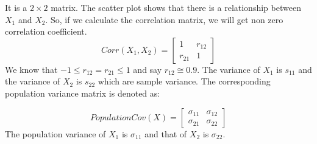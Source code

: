 \documentclass[12pt,a4paper]{report}
\begin{document}
It is a $2 \times 2$ matrix. The scatter plot shows that there is a relationship between $X_1$ and $X_2$. So, if we calculate the correlation matrix, we will get non zero correlation coefficient.
\[ Corr(X_{1},X_{2}) = 
\begin{bmatrix}
    1 & r_{12}  \\
    r_{21} & 1 
\end{bmatrix}
\]
We know that $-1 \leq r_{12} = r_{21} \leq 1$ and say $r_{12} \cong 0.9$.
The variance of $X_1$ is $s_{11}$ and the variance of $X_2$ is $s_{22}$ which are sample variance. The corresponding population variance matrix is denoted as:

\[ PopulationCov(X) = 
\begin{bmatrix}
    \sigma_{11} & \sigma_{12}  \\
    \sigma_{21} & \sigma_{22}  
\end{bmatrix}
\]
The population variance of $X_1$ is $\sigma_{11}$ and that of  $X_2$ is $\sigma_{22}$. 
\end{document}
